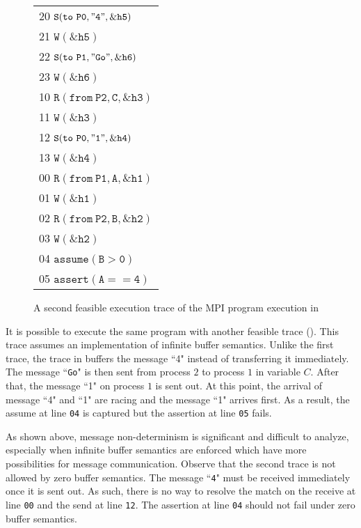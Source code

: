 \begin{figure}[t]
\begin{center}
\setlength{\tabcolsep}{2pt}
\small \begin{tabular}[t]{l}
20 $\mathtt{S(to\ P0, "4", \&h5)}$ \\
21 $\mathtt{W(\&h5)}$\\
22 $\mathtt{S(to\ P1, "Go", \&h6)}$ \\
23 $\mathtt{W(\&h6)}$ \\
\hline
10 $\mathtt{R(from\ P2, C, \&h3)}$ \\
11 $\mathtt{W(\&h3)}$ \\
12 $\mathtt{S(to\ P0, "1", \&h4)}$ \\
13 $\mathtt{W(\&h4)}$ \\
\hline
00 $\mathtt{R(from\ P1, A, \&h1)}$ \\
01 $\mathtt{W(\&h1)}$ \\
02 $\mathtt{R(from\ P2, B, \&h2)}$ \\
03 $\mathtt{W(\&h2)}$ \\
04 $\mathtt{assume(B > 0)}$ \\
05 $\mathtt{assert(A == 4)}$ \\
\hline
\end{tabular}
\end{center}
\caption{A second feasible execution trace of the MPI program execution in }
\label{fig:trace2}
\end{figure}

It is possible to execute the same program with another feasible trace (). This trace assumes an implementation of infinite buffer semantics. Unlike the first trace, the trace in  buffers the message ``4" instead of transferring it immediately. The message ``\texttt{Go}" is then sent from process $2$ to process $1$ in variable $C$. After that, the message ``1" on process $1$ is sent out. At this point, the arrival of message ``4" and ``1" are racing and the message ``1" arrives first. As a result, the assume at line \texttt{04} is captured but the assertion at line \texttt{05} fails.

As shown above, message non-determinism is significant and difficult to analyze, especially when infinite buffer semantics are enforced which have more possibilities for message communication. Observe that the second trace is not allowed by zero buffer semantics. The message ``\texttt{4}" must be received immediately once it is sent out. As such, there is no way to resolve the match on the receive at line \texttt{00} and the send at line \texttt{12}.  The assertion at line \texttt{04} should not fail under zero buffer semantics. 


